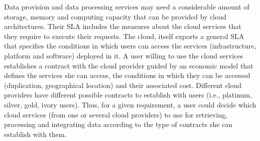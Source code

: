 \documentclass[11pt,a4paper,oneside]{report}
\begin{document}
Data provision and data processing services may need a considerable amount of storage, memory and computing capacity that can be provided by cloud architectures. 
Their SLA includes the measures about the cloud services that they require to execute their requests. The cloud, itself exports a general SLA that specifies the conditions in which users can access the services (infrastructure, platform and software) deployed in it. A user willing to use the cloud services establishes a contract with the cloud provider guided by an economic model that defines the services she can access, the conditions in which they can be accessed (duplication, geographical location) and their associated cost. Different cloud providers have different possible contracts to establish with users (i.e., platinum, silver, gold, ivory users). Thus, for a given requirement, a user could decide which cloud services (from one or several cloud providers) to use for retrieving, processing and integrating data according to the type of contracts she can establish with them.

\end{document}
